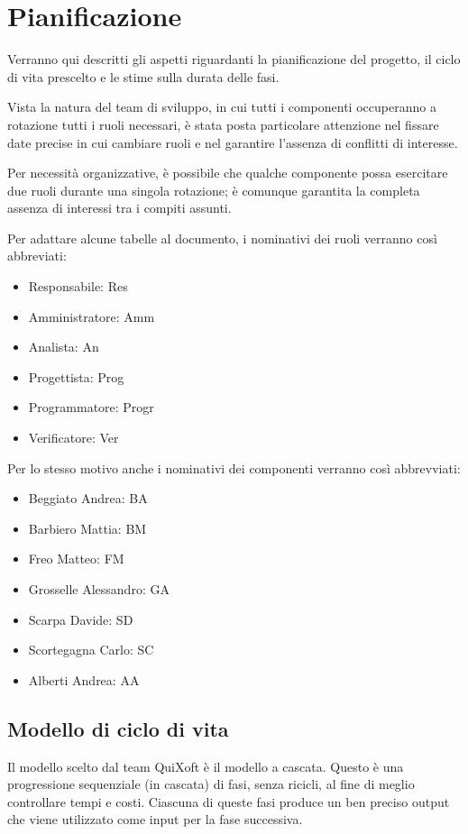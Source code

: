 \documentclass[11pt,a4paper]{article}
\begin{document}
\section{Pianificazione}
Verranno qui descritti gli aspetti riguardanti la pianificazione del progetto, il ciclo di vita prescelto e le stime sulla durata delle fasi.

Vista la natura del team di sviluppo, in cui tutti i componenti occuperanno a rotazione tutti i ruoli necessari, è stata posta particolare attenzione nel fissare date precise in cui cambiare ruoli e nel garantire l'assenza di conflitti di interesse.

Per necessità organizzative, è possibile che qualche componente possa esercitare due ruoli durante una singola rotazione; è comunque garantita la completa assenza di interessi tra i compiti assunti.
\bigskip

Per adattare alcune tabelle al documento, i nominativi dei ruoli verranno così abbreviati:
\begin{itemize}
\item Responsabile: Res
\item Amministratore: Amm
\item Analista: An
\item Progettista: Prog
\item Programmatore: Progr
\item Verificatore: Ver
\end{itemize}
\bigskip
Per lo stesso motivo anche i nominativi dei componenti verranno così abbrevviati:
\begin{itemize}
\item Beggiato Andrea: BA
\item Barbiero Mattia: BM
\item Freo Matteo: FM
\item Grosselle Alessandro: GA
\item Scarpa Davide: SD
\item Scortegagna Carlo: SC
\item Alberti Andrea: AA
\end{itemize}
\subsection{Modello di ciclo di vita}
Il modello scelto dal team QuiXoft è il modello a cascata.
Questo è una progressione sequenziale (in cascata) di fasi, senza ricicli, al fine di meglio controllare tempi e costi.
Ciascuna di queste fasi produce un ben preciso output che viene utilizzato come input per la fase successiva.
\end{document}
